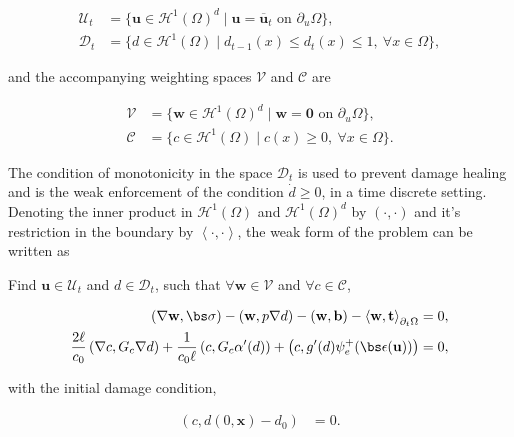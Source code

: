   \begin{align}
    \boldsymbol{\mathcal{U}}_t & = \{ \textbf{u} \in \mathcal{H}^1(\Omega)^d \mid \textbf{u} = \overline{\textbf{u}}_t \text{ on } \partial_u\Omega \}, \\
    \mathcal{D}_t      & = \{ d \in \mathcal{H}^1(\Omega) \mid d_{t-1}(x) \le d_t(x) \le 1,\ \forall x \in \Omega \}, 
  \end{align}

\noindent and the accompanying weighting spaces $\boldsymbol{\mathcal{V}}$ and $\mathcal{C}$ are

  \begin{align}
    \boldsymbol{\mathcal{V}} & = \{ \textbf{w} \in \mathcal{H}^1(\Omega)^d \mid \textbf{w} = \boldsymbol{0} \text{ on } \partial_u\Omega \}, \\
    \mathcal{C}      & = \{ c \in \mathcal{H}^1(\Omega) \mid c(x) \ge 0,\ \forall x \in \Omega \}.                                                     
  \end{align}

The condition of monotonicity in the space $\mathcal{D}_t$ is used to prevent damage healing and is the weak enforcement of the condition $\dot d \ge 0$, in a time discrete setting. Denoting the inner product in $\mathcal{H}^1(\Omega)$ and $\mathcal{H}^1(\Omega)^d$ by $\left( \cdot, \cdot \right)$ and it's restriction in the boundary by $\left<\cdot,\cdot\right>$, the weak form of the problem can be written as


\begin{mdframed}[
    frametitle={Weak form},
    frametitlebackgroundcolor=gray!20,
    backgroundcolor=gray!5,
    linewidth=0pt,
    nobreak=true
  ]
  Find $\textbf{u} \in \boldsymbol{\mathcal{U}}_t$ and $d \in \mathcal{D}_t$, such that $\forall \textbf{w} \in \boldsymbol{\mathcal{V}}$ and $\forall c \in \mathcal{C}$,
  
    \begin{align}
      \left( \nabla \textbf{w}, \bs\sigma \right) - \left( \textbf{w}, p\nabla d \right) - \left( \textbf{w}, \textbf{b} \right) - \left< \textbf{w}, \textbf{t} \right>_{\partial_t\Omega} & = 0, \\
      \frac{2\ell}{c_0}\left( \nabla c, G_c\nabla d \right) + \frac{1}{c_0\ell}\left( c, G_c\alpha'(d) \right) + \left( c, g'(d)\psi_e^+ (\bs\epsilon(\textbf{u})) \right) & = 0,\label{weak damage equation}
    \end{align}
 
\noindent with the initial damage condition,
 
    \begin{align}
      \left( c, d(0,\textbf{x}) - d_0 \right)                & = 0.
    \end{align}
 
\end{mdframed}

